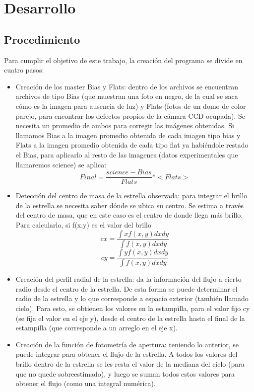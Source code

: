 \documentclass[a4paper, 11pt, spanish]{article}
\begin{document}
\section{Desarrollo}
\subsection{Procedimiento}

Para cumplir el objetivo de este trabajo, la creaci\'on del programa se divide en cuatro pasos:

\begin{itemize}
	\item Creaci\'on de los master Bias y Flats: dentro de los archivos se encuentran archivos de tipo Bias (que muestran una foto en negro, de la cual se saca c\'omo es la imagen para ausencia de luz) y Flats (fotos de un domo de color parejo, para encontrar los defectos propios de la c\'amara CCD ocupada). Se necesita un promedio de ambos para corregir las im\'agenes obtenidas. Si llamamos Bias a la imagen promedio obtenida de cada imagen tipo bias y Flats a la imagen promedio obtenida de cada tipo flat ya habi\'endole restado el Bias, para aplicarlo al resto de las imagenes (datos experimentales que llamaremos science) se aplica:
	\begin{equation*}
	Final = \frac{science - Bias}{Flats} * <Flats>
	\end{equation*}
	\item Detecci\'on del centro de masa de la estrella observada: para integrar el brillo de la estrella se necesita saber d\'onde se ubica su centro. Se estima a trav\'es del centro de masa, que en este caso es el centro de donde llega m\'as brillo. Para calcularlo, si f(x,y) es el valor del brillo 
	\begin{equation*}
	cx = \frac{\int xf(x,y) dx dy}{\int f(x,y) dx dy}
	\end{equation*}
	\begin{equation*}
	cy = \frac{\int yf(x,y) dx dy}{\int f(x,y) dx dy}
	\end{equation*}
	\item Creaci\'on del perfil radial de la estrella: da la informaci\'on del flujo a cierto radio desde el centro de la estrella. De esta forma se puede determinar el radio de la estrella y lo que corresponde a espacio exterior (tambi\'en llamado cielo). Para esto, se obtienen los valores en la estampilla, para el valor fijo cy (se fija el valor en el eje y), desde el centro de la estrella hasta el final de la estampilla (que corresponde a un arreglo en el eje x). 
	\item Creaci\'on de la funci\'on de fotometr\'ia de apertura: teniendo lo anterior, se puede integrar para obtener el flujo de la estrella. A todos los valores del brillo dentro de la estrella se les resta el valor de la mediana del cielo (para que no quede sobreestimado), y luego se suman todos estos valores para obtener el flujo (como una integral num\'erica).
\end{itemize}
\end{document}
